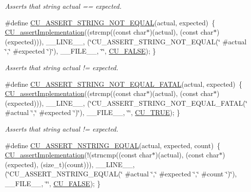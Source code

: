 \begin{DoxyCompactItemize}
\begin{DoxyCompactList}\small\item\em Asserts that string actual == expected. \end{DoxyCompactList}\item 
\#define \hyperlink{group__Framework_ga423898d76eb348c950d21bb488f219f3}{C\-U\-\_\-\-A\-S\-S\-E\-R\-T\-\_\-\-S\-T\-R\-I\-N\-G\-\_\-\-N\-O\-T\-\_\-\-E\-Q\-U\-A\-L}(actual, expected)~\{ \hyperlink{group__Framework_ga31a858e8b496b2af992b63902064c5fa}{C\-U\-\_\-assert\-Implementation}((strcmp((const char$\ast$)(actual), (const char$\ast$)(expected))), \-\_\-\-\_\-\-L\-I\-N\-E\-\_\-\-\_\-, (\char`\"{}C\-U\-\_\-\-A\-S\-S\-E\-R\-T\-\_\-\-S\-T\-R\-I\-N\-G\-\_\-\-N\-O\-T\-\_\-\-E\-Q\-U\-A\-L(\char`\"{} \#actual \char`\"{},\char`\"{}  \#expected \char`\"{})\char`\"{}), \-\_\-\-\_\-\-F\-I\-L\-E\-\_\-\-\_\-, \char`\"{}\char`\"{}, \hyperlink{group__Framework_ga7453214541b156ef868681eaafe60860}{C\-U\-\_\-\-F\-A\-L\-S\-E}); \}
\begin{DoxyCompactList}\small\item\em Asserts that string actual != expected. \end{DoxyCompactList}\item 
\#define \hyperlink{group__Framework_ga5a50e544bf693dbe91d26dd605753f30}{C\-U\-\_\-\-A\-S\-S\-E\-R\-T\-\_\-\-S\-T\-R\-I\-N\-G\-\_\-\-N\-O\-T\-\_\-\-E\-Q\-U\-A\-L\-\_\-\-F\-A\-T\-A\-L}(actual, expected)~\{ \hyperlink{group__Framework_ga31a858e8b496b2af992b63902064c5fa}{C\-U\-\_\-assert\-Implementation}((strcmp((const char$\ast$)(actual), (const char$\ast$)(expected))), \-\_\-\-\_\-\-L\-I\-N\-E\-\_\-\-\_\-, (\char`\"{}C\-U\-\_\-\-A\-S\-S\-E\-R\-T\-\_\-\-S\-T\-R\-I\-N\-G\-\_\-\-N\-O\-T\-\_\-\-E\-Q\-U\-A\-L\-\_\-\-F\-A\-T\-A\-L(\char`\"{} \#actual \char`\"{},\char`\"{}  \#expected \char`\"{})\char`\"{}), \-\_\-\-\_\-\-F\-I\-L\-E\-\_\-\-\_\-, \char`\"{}\char`\"{}, \hyperlink{group__Framework_ga99641394bc766ca9c4a295e942fed1ef}{C\-U\-\_\-\-T\-R\-U\-E}); \}
\begin{DoxyCompactList}\small\item\em Asserts that string actual != expected. \end{DoxyCompactList}\item 
\#define \hyperlink{group__Framework_ga04f63f895c1b37058af366ac334e584d}{C\-U\-\_\-\-A\-S\-S\-E\-R\-T\-\_\-\-N\-S\-T\-R\-I\-N\-G\-\_\-\-E\-Q\-U\-A\-L}(actual, expected, count)~\{ \hyperlink{group__Framework_ga31a858e8b496b2af992b63902064c5fa}{C\-U\-\_\-assert\-Implementation}(!(strncmp((const char$\ast$)(actual), (const char$\ast$)(expected), (size\-\_\-t)(count))), \-\_\-\-\_\-\-L\-I\-N\-E\-\_\-\-\_\-, (\char`\"{}C\-U\-\_\-\-A\-S\-S\-E\-R\-T\-\_\-\-N\-S\-T\-R\-I\-N\-G\-\_\-\-E\-Q\-U\-A\-L(\char`\"{} \#actual \char`\"{},\char`\"{}  \#expected \char`\"{},\char`\"{} \#count \char`\"{})\char`\"{}), \-\_\-\-\_\-\-F\-I\-L\-E\-\_\-\-\_\-, \char`\"{}\char`\"{}, \hyperlink{group__Framework_ga7453214541b156ef868681eaafe60860}{C\-U\-\_\-\-F\-A\-L\-S\-E}); \}

\end{DoxyCompactItemize}
